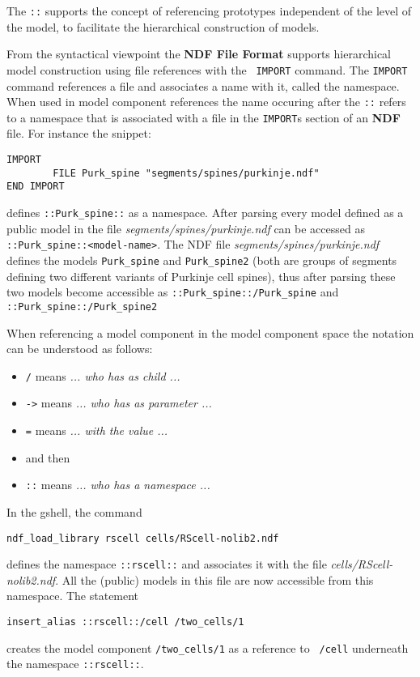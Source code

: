 \documentclass[12pt]{article}
\begin{document}
The {\tt ::} supports the concept of referencing prototypes
independent of the level of the model, to facilitate the hierarchical
construction of models.

From the syntactical viewpoint the {\bf NDF File Format} supports
hierarchical model construction using file references with the {\tt
  IMPORT} command.  The {\tt IMPORT} command references a file and
associates a name with it, called the namespace.  When used in model
component references the name occuring after the {\tt ::} refers to a
namespace that is associated with a file in the {\tt IMPORT}s section
of an {\bf NDF} file.  For instance the snippet:

\begin{verbatim}
IMPORT
        FILE Purk_spine "segments/spines/purkinje.ndf"
END IMPORT
\end{verbatim}

defines {\tt ::Purk\_spine::} as a namespace.  After parsing every
model defined as a public model in the file {\it
  segments/spines/purkinje.ndf} can be accessed as {\tt
  ::Purk\_spine::<model-name>}.  The NDF file {\it
  segments/spines/purkinje.ndf} defines the models {\tt Purk\_spine}
and {\tt Purk\_spine2} (both are groups of segments defining two
different variants of Purkinje cell spines), thus after parsing these
two models become accessible as {\tt ::Purk\_spine::/Purk\_spine} and
{\tt ::Purk\_spine::/Purk\_spine2}

When referencing a model component in the model component space the
notation can be understood as follows:

\begin{itemize}
\item[] {\tt /} means {\it ... who has as child ...}
\item[] {\tt ->} means {\it ... who has as parameter ...}
\item[] {\tt =} means {\it ... with the value ...}

\item[]  and then

\item[] {\tt ::} means {\it ... who has a namespace ...}
\end{itemize}

In the gshell, the command

\begin{verbatim}
ndf_load_library rscell cells/RScell-nolib2.ndf
\end{verbatim}

defines the namespace {\tt ::rscell::} and associates it with the file
{\it cells/RScell-nolib2.ndf}.  All the (public) models in this file
are now accessible from this namespace.  The statement

\begin{verbatim}
insert_alias ::rscell::/cell /two_cells/1
\end{verbatim}

creates the model component {\tt /two\_cells/1} as a reference to {\tt
  /cell} underneath the namespace {\tt ::rscell::}.
\end{document}
